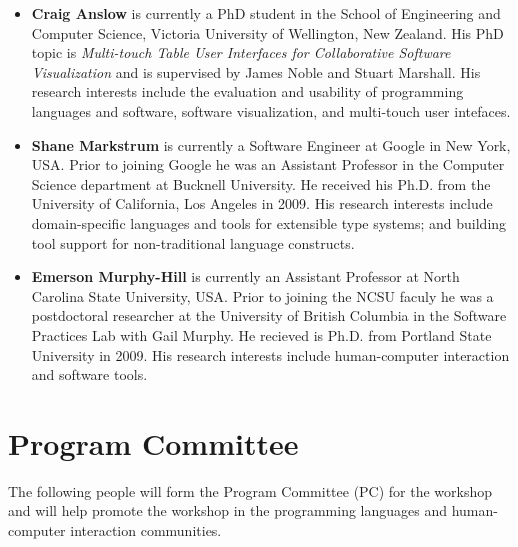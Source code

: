 \documentclass[authorpermission]{sigplanconf}
\begin{document}
\begin{itemize}
\item \textbf{Craig Anslow} is currently a PhD student in the School of
  Engineering and Computer Science, Victoria University of Wellington,
  New Zealand. His PhD topic is \emph{Multi-touch Table User
    Interfaces for Collaborative Software Visualization} and is
  supervised by James Noble and Stuart Marshall. His research interests include the evaluation and usability of programming languages and software, software visualization, and multi-touch user intefaces.

\item \textbf{Shane Markstrum} is currently a Software Engineer at Google in New York, USA. Prior to joining Google he was an Assistant Professor in the Computer Science
  department at Bucknell University. He received his Ph.D. from the University of
  California, Los Angeles in 2009. His research interests include
  domain-specific languages and tools for extensible type systems; and 
  building tool support for non-traditional language constructs.
  
\item \textbf{Emerson Murphy-Hill} is currently an Assistant Professor at North Carolina State University, USA. Prior to joining the NCSU faculy he was a postdoctoral researcher at the University of British Columbia in the Software Practices Lab with Gail Murphy. 
  He recieved is Ph.D. from Portland State University in 2009.
  His research interests include human-computer interaction and software tools. 
\end{itemize}

\section{Program Committee}

The following people will form the Program Committee (PC) for the workshop and will help promote the workshop in the programming languages and human-computer interaction communities.
\end{document}
